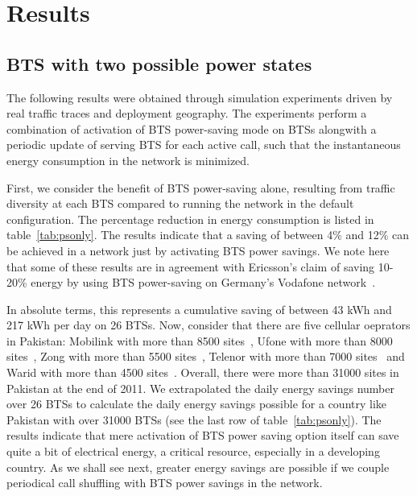 \section{Results}
\label{sec:results}

\subsection{BTS with two possible power states}
\label{subsec:results1}
The following results were obtained through simulation experiments driven by real traffic traces and deployment geography. The experiments perform a combination of activation of BTS power-saving mode on BTSs alongwith a periodic update of serving BTS for each active call, such that the instantaneous energy consumption in the network is minimized.

First, we consider the benefit of BTS power-saving alone, resulting from traffic diversity at each BTS compared to running the network in the default configuration. The percentage reduction in energy consumption is listed in table~\ref{tab:psonly}. The results indicate that a saving of between 4\% and 12\% can be achieved in a network just by activating BTS power savings. We note here that some of these results are in agreement with Ericsson's claim of saving 10-20\% energy by using BTS power-saving on Germany's Vodafone network~\cite{ericssonclaim}. 

In absolute terms, this represents a cumulative saving of between 43 kWh and 217 kWh per day on 26 BTSs. Now, consider that there are five cellular oeprators in Pakistan: Mobilink with more than 8500 sites~\cite{mobilinksitecount}, Ufone with more than 8000 sites~\cite{ptaannreport}, Zong with more than 5500 sites~\cite{ptaannreport}, Telenor with more than 7000 sites~\cite{telenorsitecount} and Warid with more than 4500 sites~\cite{ptaannreport}. Overall, there were more than 31000 sites in Pakistan at the end of 2011. We extrapolated the daily energy savings number over 26 BTSs to calculate the daily energy savings possible for a country like Pakistan with over 31000 BTSs (see the last row of table~\ref{tab:psonly}). The results indicate that mere activation of BTS power saving option itself can save quite a bit of electrical energy, a critical resource, especially in a developing country. As we shall see next, greater energy savings are possible if we couple periodical call shuffling with BTS power savings in the network. 

